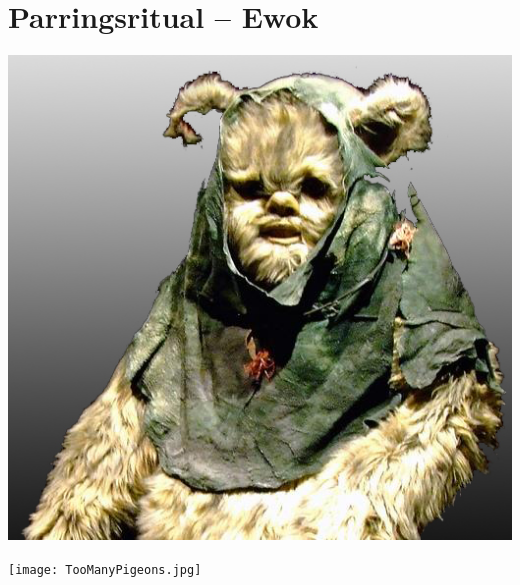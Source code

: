 \documentclass[article,10pt,a4,oneside]{memoir}
\begin{document}
\begin{minipage}[b]{1.95\textwidth}
\begin{minipage}[t]{0.23\linewidth}
\vspace{3mm}
\section*{Parringsritual -- Ewok}

\begin{center}
\includegraphics[width=0.8\linewidth]{Ewok.jpg}
\end{center}
\end{minipage}
\hspace{2mm}
\begin{minipage}[t]{0.46\linewidth}



\begin{center}
\texttt{[image: TooManyPigeons.jpg]}
\end{center}
\end{minipage}
\hspace{2mm}
\begin{minipage}[t]{0.23\linewidth}

\vspace{1mm}


\end{minipage}
\end{minipage}
\end{document}
